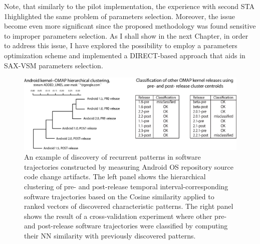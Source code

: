 Note, that similarly to the pilot implementation, the experience with second STA 1highlighted the same problem of 
parameters selection. Moreover, the issue become even more significant since the proposed methodology was found sensitive to 
improper parameters selection. As I shall show in the next Chapter, in order to address this issue, I have explored the possibility to 
employ a parameters optimization scheme and implemented a DIRECT-based approach \cite{citeulike:12563460} that aids in SAX-VSM 
parameters selection.

\begin{figure}[t]
   \centering
   \includegraphics[width=145mm]{figures/STA2.eps}
   \caption{An example of discovery of recurrent patterns in software trajectories constructed by measuring Android OS 
   repository source code change artifacts.
   The left panel shows the hierarchical clustering of pre- and post-release temporal interval-corresponding software 
   trajectories based on the Cosine similarity applied to ranked vectors of discovered characteristic patterns.
   The right panel shows the result of a cross-validation experiment where other pre- and post-release software trajectories 
   were classified by computing their NN similarity with previously discovered patterns.}
   \label{fig:STA2-results}
\end{figure}

